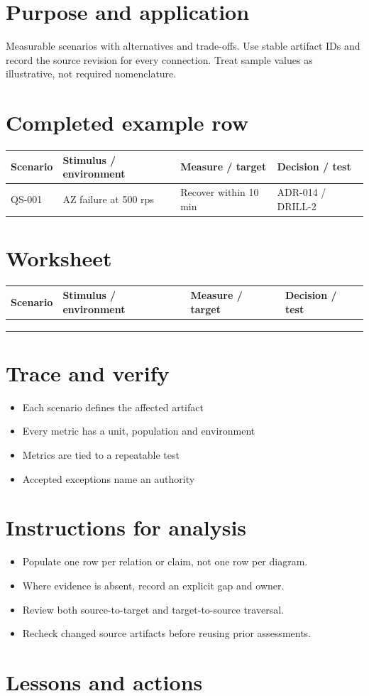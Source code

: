 \documentclass[10pt,letterpaper]{article}
\begin{document}
\DocProvenance
\section{Purpose and application}
Measurable scenarios with alternatives and trade-offs. Use stable artifact IDs and record the source revision for every connection. Treat sample values as illustrative, not required nomenclature.

\section{Completed example row}
\small
\begin{tabularx}{\linewidth}{@{}YYYY@{}}
\toprule
\textbf{Scenario} & \textbf{Stimulus / environment} & \textbf{Measure / target} & \textbf{Decision / test} \\
\midrule
QS-001 & AZ failure at 500 rps & Recover within 10 min & ADR-014 / DRILL-2 \\
\bottomrule
\end{tabularx}
\normalsize
\section{Worksheet}
\small
\begin{tabularx}{\linewidth}{@{}YYYY@{}}
\toprule
\textbf{Scenario} & \textbf{Stimulus / environment} & \textbf{Measure / target} & \textbf{Decision / test} \\
\midrule
 &  &  &  \\
 &  &  &  \\
 &  &  &  \\
\bottomrule
\end{tabularx}
\normalsize
\section{Trace and verify}
\begin{itemize}
\item Each scenario defines the affected artifact
\item Every metric has a unit, population and environment
\item Metrics are tied to a repeatable test
\item Accepted exceptions name an authority
\end{itemize}
\section{Instructions for analysis}
\begin{itemize}
\item Populate one row per relation or claim, not one row per diagram.
\item Where evidence is absent, record an explicit gap and owner.
\item Review both source-to-target and target-to-source traversal.
\item Recheck changed source artifacts before reusing prior assessments.
\end{itemize}
\section{Lessons and actions}
\end{document}
